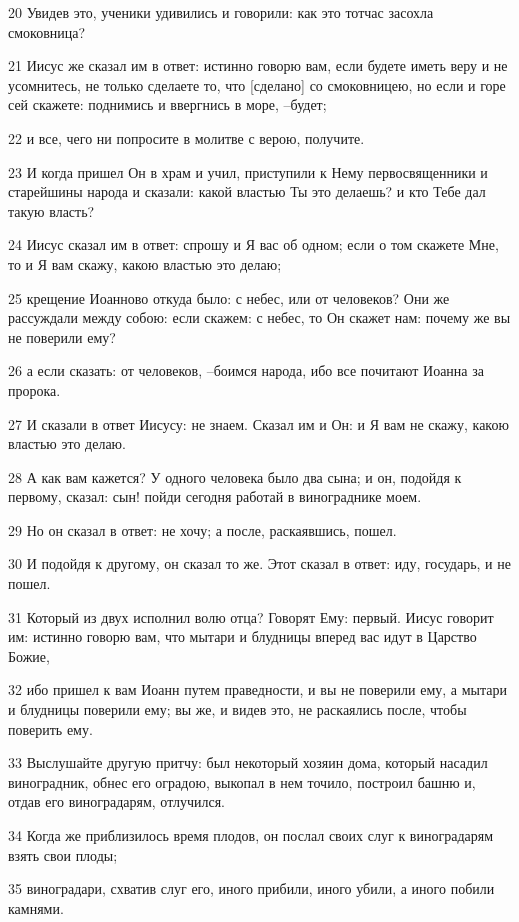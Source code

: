 \par 20 Увидев это, ученики удивились и говорили: как это тотчас засохла смоковница?
\par 21 Иисус же сказал им в ответ: истинно говорю вам, если будете иметь веру и не усомнитесь, не только сделаете то, что [сделано] со смоковницею, но если и горе сей скажете: поднимись и ввергнись в море, --будет;
\par 22 и все, чего ни попросите в молитве с верою, получите.
\par 23 И когда пришел Он в храм и учил, приступили к Нему первосвященники и старейшины народа и сказали: какой властью Ты это делаешь? и кто Тебе дал такую власть?
\par 24 Иисус сказал им в ответ: спрошу и Я вас об одном; если о том скажете Мне, то и Я вам скажу, какою властью это делаю;
\par 25 крещение Иоанново откуда было: с небес, или от человеков? Они же рассуждали между собою: если скажем: с небес, то Он скажет нам: почему же вы не поверили ему?
\par 26 а если сказать: от человеков, --боимся народа, ибо все почитают Иоанна за пророка.
\par 27 И сказали в ответ Иисусу: не знаем. Сказал им и Он: и Я вам не скажу, какою властью это делаю.
\par 28 А как вам кажется? У одного человека было два сына; и он, подойдя к первому, сказал: сын! пойди сегодня работай в винограднике моем.
\par 29 Но он сказал в ответ: не хочу; а после, раскаявшись, пошел.
\par 30 И подойдя к другому, он сказал то же. Этот сказал в ответ: иду, государь, и не пошел.
\par 31 Который из двух исполнил волю отца? Говорят Ему: первый. Иисус говорит им: истинно говорю вам, что мытари и блудницы вперед вас идут в Царство Божие,
\par 32 ибо пришел к вам Иоанн путем праведности, и вы не поверили ему, а мытари и блудницы поверили ему; вы же, и видев это, не раскаялись после, чтобы поверить ему.
\par 33 Выслушайте другую притчу: был некоторый хозяин дома, который насадил виноградник, обнес его оградою, выкопал в нем точило, построил башню и, отдав его виноградарям, отлучился.
\par 34 Когда же приблизилось время плодов, он послал своих слуг к виноградарям взять свои плоды;
\par 35 виноградари, схватив слуг его, иного прибили, иного убили, а иного побили камнями.
